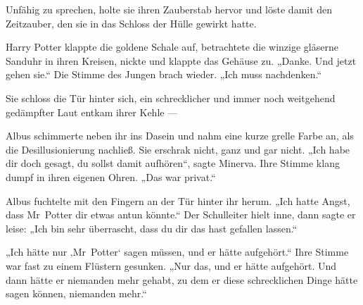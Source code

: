 Unfähig zu sprechen, holte sie ihren Zauberstab hervor und löste damit den Zeitzauber, den sie in das Schloss der Hülle gewirkt hatte.

Harry Potter klappte die goldene Schale auf, betrachtete die winzige gläserne Sanduhr in ihren Kreisen, nickte und klappte das Gehäuse zu.
„Danke. Und jetzt gehen sie.“ Die Stimme des Jungen brach wieder.
„Ich muss nachdenken.“

\later

Sie schloss die Tür hinter sich, ein schrecklicher und immer noch weitgehend gedämpfter Laut entkam ihrer Kehle —


Albus schimmerte neben ihr ins Dasein und nahm eine kurze grelle Farbe an, als die Desillusionierung nachließ. Sie erschrak nicht, ganz und gar nicht.
„Ich habe dir doch gesagt, du sollst damit aufhören“, sagte Minerva. Ihre Stimme klang dumpf in ihren eigenen Ohren.
„Das war privat.“

Albus fuchtelte mit den Fingern an der Tür hinter ihr herum.
„Ich hatte Angst, dass Mr~Potter dir etwas antun könnte.“ Der Schulleiter hielt inne, dann sagte er leise:
„Ich bin sehr überrascht, dass du dir das hast gefallen lassen.“

„Ich hätte nur ‚Mr~Potter‘ sagen müssen, und er hätte aufgehört.“ Ihre Stimme war fast zu einem Flüstern gesunken.
„Nur das, und er hätte aufgehört. Und dann hätte er niemanden mehr gehabt, zu dem er diese schrecklichen Dinge hätte sagen können, niemanden mehr.“

